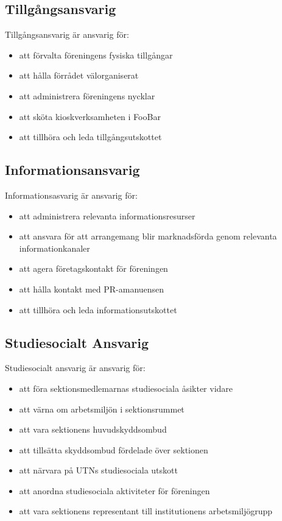 \documentclass[a4paper]{article}
\begin{document}
{  \subsection{Tillgångsansvarig}
  Tillgångsansvarig är ansvarig för:
  \begin{itemize}
    \item att förvalta föreningens fysiska tillgångar
    \item att hålla förrådet välorganiserat
    \item att administrera föreningens nycklar
    \item att sköta kioskverksamheten i FooBar
    \item att tillhöra och leda tillgångsutskottet
  \end{itemize}
  
  \subsection{Informationsansvarig}
  Informationsasvarig är ansvarig för:
  \begin{itemize}
    \item att administrera relevanta informationsresurser
    \item att ansvara för att arrangemang blir marknadsförda genom relevanta informationkanaler
    \item att agera företagskontakt för föreningen
    \item att hålla kontakt med PR-amanuensen
    \item att tillhöra och leda informationsutskottet
  \end{itemize}}

\subsection{Studiesocialt Ansvarig}
Studiesocialt ansvarig är ansvarig för:
\begin{itemize}
  \item att föra sektionsmedlemarnas studiesociala åsikter vidare
  \item att värna om arbetsmiljön i sektionsrummet
  \item att vara sektionens huvudskyddsombud
  \item att tillsätta skyddsombud fördelade över sektionen
  \item att närvara på UTNs studiesociala utskott
  \item att anordna studiesociala aktiviteter för föreningen
  \item att vara sektionens representant till institutionens arbetsmiljögrupp
\end{itemize}
\end{document}

